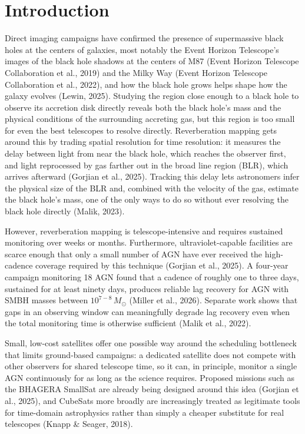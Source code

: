 \documentclass[11pt]{article}
\begin{document}
\section{Introduction}

Direct imaging campaigns have confirmed the presence of supermassive black holes at the centers of galaxies, most notably the Event Horizon Telescope's images of the black hole shadows at the centers of M87 (Event Horizon Telescope Collaboration et al., 2019) and the Milky Way (Event Horizon Telescope Collaboration et al., 2022), and how the black hole grows helps shape how the galaxy evolves (Lewin, 2025). Studying the region close enough to a black hole to observe its accretion disk directly reveals both the black hole's mass and the physical conditions of the surrounding accreting gas, but this region is too small for even the best telescopes to resolve directly. Reverberation mapping gets around this by trading spatial resolution for time resolution: it measures the delay between light from near the black hole, which reaches the observer first, and light reprocessed by gas farther out in the broad line region (BLR), which arrives afterward (Gorjian et al., 2025). Tracking this delay lets astronomers infer the physical size of the BLR and, combined with the velocity of the gas, estimate the black hole's mass, one of the only ways to do so without ever resolving the black hole directly (Malik, 2023).

However, reverberation mapping is telescope-intensive and requires sustained monitoring over weeks or months. Furthermore, ultraviolet-capable facilities are scarce enough that only a small number of AGN have ever received the high-cadence coverage required by this technique (Gorjian et al., 2025). A four-year campaign monitoring 18 AGN found that a cadence of roughly one to three days, sustained for at least ninety days, produces reliable lag recovery for AGN with SMBH masses between $10^{7-8}\,M_\odot$ (Miller et al., 2026). Separate work shows that gaps in an observing window can meaningfully degrade lag recovery even when the total monitoring time is otherwise sufficient (Malik et al., 2022).

Small, low-cost satellites offer one possible way around the scheduling bottleneck that limits ground-based campaigns: a dedicated satellite does not compete with other observers for shared telescope time, so it can, in principle, monitor a single AGN continuously for as long as the science requires. Proposed missions such as the BHAGERA SmallSat are already being designed around this idea (Gorjian et al., 2025), and CubeSats more broadly are increasingly treated as legitimate tools for time-domain astrophysics rather than simply a cheaper substitute for real telescopes (Knapp \& Seager, 2018).
\end{document}
